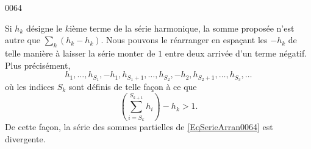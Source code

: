 
\begin{corrige}{0064}

Si $h_k$ désigne le $k$ième terme de la série harmonique, la somme proposée n'est autre que $\sum_k(h_k-h_k)$. Nous pouvons le réarranger en espaçant les $-h_k$ de telle manière à laisser la série monter de $1$ entre deux arrivée d'un terme négatif. Plus précisément,
\begin{equation}		\label{EqSerieArran0064}
	h_1,\ldots,h_{S_1},-h_1,h_{S_1+1},\ldots,h_{S_2},-h_2,h_{S_2+1},\ldots,h_{S_3},\ldots	
\end{equation}
où les indices $S_k$ sont définis de telle façon à ce que
\begin{equation}
	(\sum_{i=S_k}^{S_{k+1}}h_i)-h_k>1.
\end{equation}
De cette façon, la série des sommes partielles de \eqref{EqSerieArran0064} est divergente.

\end{corrige}
